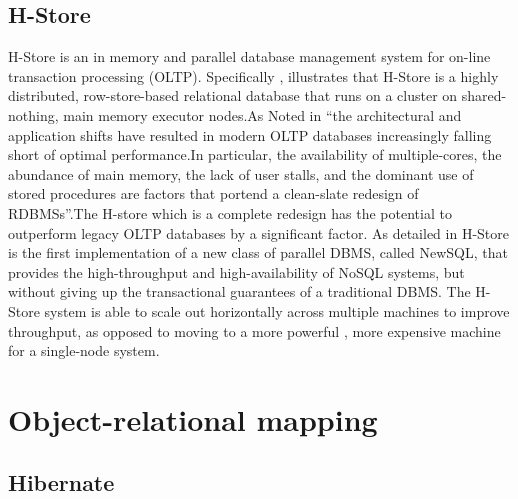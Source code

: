 \subsection{H-Store}

     H-Store is an in memory and parallel database management system
     for on-line transaction processing (OLTP). Specifically ,
     \cite{www-Hstore} illustrates that H-Store is a highly
     distributed, row-store-based relational database that runs on a
     cluster on shared-nothing, main memory executor nodes.As Noted in
     \cite{kallman2008} ``the architectural and application shifts
     have resulted in modern OLTP databases increasingly falling short
     of optimal performance.In particular, the availability of
     multiple-cores, the abundance of main memory, the lack of user
     stalls, and the dominant use of stored procedures are factors
     that portend a clean-slate redesign of RDBMSs''.The H-store which
     is a complete redesign has the potential to outperform legacy
     OLTP databases by a significant factor.  As detailed in
     \cite{www-Hstorewiki} H-Store is the first implementation of a
     new class of parallel DBMS, called NewSQL, that provides the
     high-throughput and high-availability of NoSQL systems, but
     without giving up the transactional guarantees of a traditional
     DBMS.  The H-Store system is able to scale out horizontally
     across multiple machines to improve throughput, as opposed to
     moving to a more powerful , more expensive machine for a
     single-node system.

\section{Object-relational mapping}
\label{S:o-db-object}

\subsection{Hibernate}

